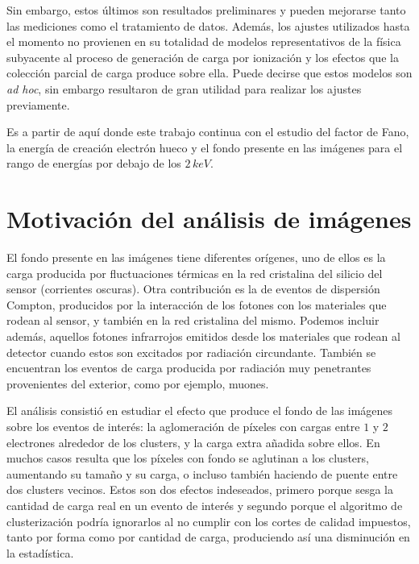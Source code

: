 Sin embargo, estos últimos son resultados preliminares y pueden mejorarse tanto las mediciones como el tratamiento de datos. Además, los ajustes utilizados hasta el momento no provienen en su totalidad de modelos representativos de la física subyacente al proceso de generación de carga por ionización y los efectos que la colección parcial de carga produce sobre ella. Puede decirse que estos modelos son \textit{ad hoc}, sin embargo resultaron de gran utilidad para realizar los ajustes previamente.

Es a partir de aquí donde este trabajo continua con el estudio del factor de Fano, la energía de creación electrón hueco y el fondo presente en las imágenes para el rango de energías por debajo de los $2\,\si{keV}$.

\section{Motivación del análisis de imágenes}
\noindent El fondo presente en las imágenes tiene diferentes orígenes, uno de ellos es la carga producida por fluctuaciones térmicas en la red cristalina del silicio del sensor (corrientes oscuras). Otra contribución es la de eventos de dispersión Compton, producidos por la interacción de los fotones con los materiales que rodean al sensor, y también en la red cristalina del mismo. Podemos incluir además, aquellos fotones infrarrojos emitidos desde los materiales que rodean al detector cuando estos son excitados por radiación circundante. También se encuentran los eventos de carga producida por radiación muy penetrantes provenientes del exterior, como por ejemplo, muones.

El análisis consistió en estudiar el efecto que produce el fondo de las imágenes sobre los eventos de interés: la aglomeración de píxeles con cargas entre $1$ y $2$ electrones alrededor de los clusters, y la carga extra añadida sobre ellos. En muchos casos resulta que los píxeles con fondo se aglutinan a los clusters, aumentando su tamaño y su carga, o incluso también haciendo de puente entre dos clusters vecinos. Estos son dos efectos indeseados, primero porque sesga la cantidad de carga real en un evento de interés y segundo porque el algoritmo de clusterización podría ignorarlos al no cumplir con los cortes de calidad impuestos, tanto por forma como por cantidad de carga, produciendo así una disminución en la estadística.

